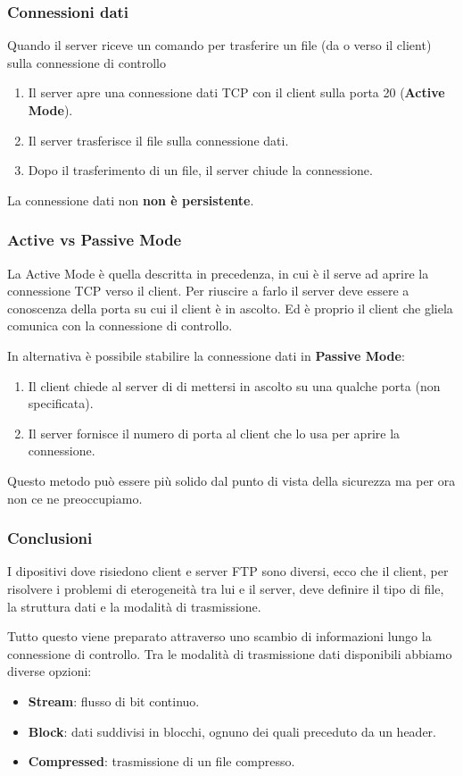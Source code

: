 \subsubsection{Connessioni dati}
Quando il server riceve un comando per trasferire un file (da o verso il client) sulla connessione
di controllo
\begin{enumerate}
	\item Il server apre una connessione dati TCP con il client sulla porta 20
		(\textbf{Active Mode}).
	\item Il server trasferisce il file sulla connessione dati.
	\item Dopo il trasferimento di un file, il server chiude la connessione.
\end{enumerate}
La connessione dati non \textbf{non è persistente}.

\subsubsection{Active vs Passive Mode}
La Active Mode è quella descritta in precedenza, in cui è il serve ad aprire la connessione TCP
verso il client. Per riuscire a farlo il server deve essere a conoscenza della porta su cui il 
client è in ascolto. Ed è proprio il client che gliela comunica con la connessione di controllo.

In alternativa è possibile stabilire la connessione dati in \textbf{Passive Mode}:
\begin{enumerate}
	\item Il client chiede al server di di mettersi in ascolto su una qualche porta (non 
		specificata).
	\item Il server fornisce il numero di porta al client che lo usa per aprire la connessione.
\end{enumerate}
Questo metodo può essere più solido dal punto di vista della sicurezza ma per ora non ce ne
preoccupiamo.

\subsubsection{Conclusioni}
I dipositivi dove risiedono client e server FTP sono diversi, ecco che il client, per risolvere
i problemi di eterogeneità tra lui e il server, deve definire il tipo di file, la struttura dati
e la modalità di trasmissione.

Tutto questo viene preparato attraverso uno scambio di informazioni lungo la connessione di 
controllo. Tra le modalità di trasmissione dati disponibili abbiamo diverse opzioni:
\begin{itemize}
	\item \textbf{Stream}: flusso di bit continuo.
	\item \textbf{Block}: dati suddivisi in blocchi, ognuno dei quali preceduto da un header.
	\item \textbf{Compressed}: trasmissione di un file compresso.
\end{itemize}

